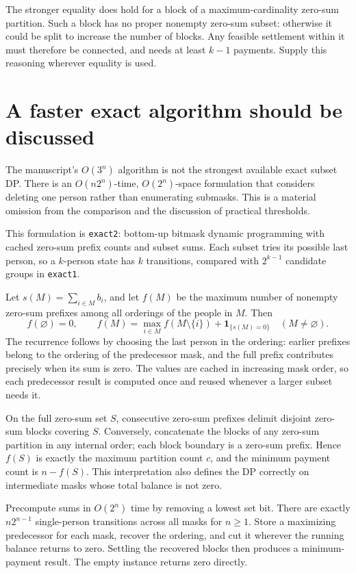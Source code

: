 \documentclass[11pt]{article}
\begin{document}
The stronger equality does hold for a block of a maximum-cardinality
zero-sum partition. Such a block has no proper nonempty zero-sum subset:
otherwise it could be split to increase the number of blocks. Any feasible
settlement within it must therefore be connected, and needs at least
$k-1$ payments. Supply this reasoning wherever equality is used.

\section{A faster exact algorithm should be discussed}

The manuscript's $O(3^n)$ algorithm is not the strongest available exact
subset DP. There is an $O(n2^n)$-time, $O(2^n)$-space formulation that
considers deleting one person rather than enumerating submasks. This is
a material omission from the comparison and the discussion of practical
thresholds.

This formulation is \texttt{exact2}: bottom-up bitmask dynamic programming
with cached zero-sum prefix counts and subset sums. Each subset tries its
possible last person, so a $k$-person state has $k$ transitions, compared
with $2^{k-1}$ candidate groups in \texttt{exact1}.

Let $s(M)=\sum_{i\in M}b_i$, and let $f(M)$ be the maximum number of
nonempty zero-sum prefixes among all orderings of the people in $M$.
Then
\[
 f(\varnothing)=0,\qquad
 f(M)=\max_{i\in M}f(M\setminus\{i\})+
             \mathbf{1}_{\{s(M)=0\}}\quad(M\ne\varnothing).
\]
The recurrence follows by choosing the last person in the ordering:
earlier prefixes belong to the ordering of the predecessor mask, and
the full prefix contributes precisely when its sum is zero.
The values are cached in increasing mask order, so each predecessor result
is computed once and reused whenever a larger subset needs it.

On the full zero-sum set $S$, consecutive zero-sum prefixes delimit
disjoint zero-sum blocks covering $S$. Conversely, concatenate the
blocks of any zero-sum partition in any internal order; each block
boundary is a zero-sum prefix. Hence $f(S)$ is exactly the maximum
partition count $c$, and the minimum payment count is $n-f(S)$.
This interpretation also defines the DP correctly on intermediate masks
whose total balance is not zero.

Precompute sums in $O(2^n)$ time by removing a lowest set bit. There
are exactly $n2^{n-1}$ single-person transitions across all masks for
$n\geq1$. Store a maximizing predecessor for each mask, recover the
ordering, and cut it wherever the running balance returns to zero.
Settling the recovered blocks then produces a minimum-payment result.
The empty instance returns zero directly.
\end{document}
